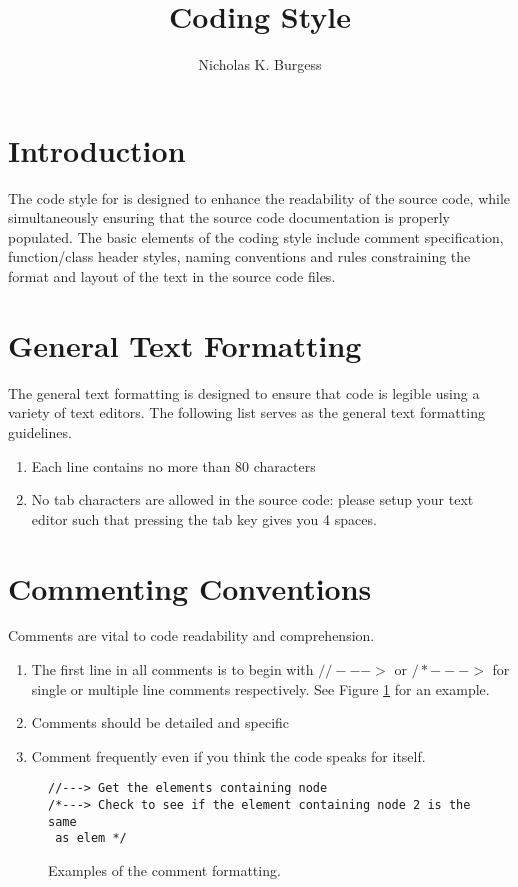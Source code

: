 \documentclass[letterpaper]{article}
\title{ Coding Style}
\author{Nicholas K. Burgess}
\newcommand{\figref}[1]{Figure \ref{#1}}                %
\begin{document}
\maketitle

\section{Introduction}
The code style for  is designed to enhance the readability of the source code, while simultaneously ensuring that the source code documentation is properly populated.  The basic elements of the  coding style include comment specification, function/class header styles, naming conventions and rules constraining the format and layout of the text in the source code files.  

\section{General Text Formatting}
The general text formatting  is  designed to ensure that code is legible using a variety of text editors.  The following list serves as the general text formatting guidelines.  
\begin{enumerate}
\item Each line contains no more than 80 characters
\item No tab characters are allowed in the source code: please setup your text editor such that pressing the tab key gives you 4 spaces.   
\end{enumerate}

\section{Commenting Conventions}
Comments are vital to code readability and comprehension.  
\begin{enumerate}
\item The first line in all comments is to begin with $//--->$ or $/*--->$ for single or multiple line comments respectively.  See \figref{fig:comment} for an example.  
\item Comments should be detailed and specific
\item Comment frequently even if you think the code speaks for itself. 
\end{enumerate}
\begin{figure}[h!]
\begin{verbatim}
//---> Get the elements containing node 
/*---> Check to see if the element containing node 2 is the same 
 as elem */
\end{verbatim}
\caption{Examples of the comment formatting. }
\label{fig:comment}
\end{figure} 
\end{document}
